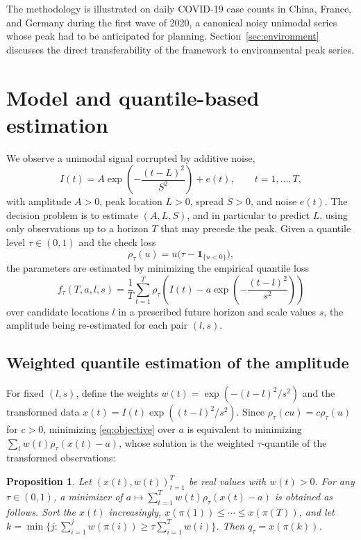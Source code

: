 \documentclass[11pt,a4paper]{article}
\newtheorem{proposition}{Proposition}
\begin{document}
The methodology is illustrated on daily COVID-19 case counts in China, France,
and Germany during the first wave of 2020, a canonical noisy unimodal series
whose peak had to be anticipated for planning. Section~\ref{sec:environment}
discusses the direct transferability of the framework to environmental peak
series.

\section{Model and quantile-based estimation}
\label{sec:model}

We observe a unimodal signal corrupted by additive noise,
\begin{equation}
I(t)=A\exp\!\left(-\frac{(t-L)^2}{S^2}\right)+e(t),
\qquad t=1,\ldots,T,
\label{eq:signal}
\end{equation}
with amplitude $A>0$, peak location $L>0$, spread $S>0$, and noise $e(t)$.
The decision problem is to estimate $(A,L,S)$, and in particular to predict
$L$, using only observations up to a horizon $T$ that may precede the peak.
Given a quantile level $\tau\in(0,1)$ and the check loss
\begin{equation}
\rho_\tau(u)=u\bigl(\tau-\mathbf 1_{\{u<0\}}\bigr),
\label{eq:check}
\end{equation}
the parameters are estimated by minimizing the empirical quantile loss
\begin{equation}
f_\tau(T,a,l,s)=\frac{1}{T}\sum_{t=1}^{T}
\rho_\tau\!\left(I(t)-a\exp\!\left(-\frac{(t-l)^2}{s^2}\right)\right)
\label{eq:objective}
\end{equation}
over candidate locations $l$ in a prescribed future horizon and scale values
$s$, the amplitude being re-estimated for each pair $(l,s)$.

\subsection{Weighted quantile estimation of the amplitude}
\label{sec:weighted}

For fixed $(l,s)$, define the weights $w(t)=\exp(-(t-l)^2/s^2)$ and the
transformed data $x(t)=I(t)\exp((t-l)^2/s^2)$. Since $\rho_\tau(cu)=c\rho_\tau(u)$
for $c>0$, minimizing \eqref{eq:objective} over $a$ is equivalent to
minimizing $\sum_t w(t)\rho_\tau(x(t)-a)$, whose solution is the weighted
$\tau$-quantile of the transformed observations:

\begin{proposition}
\label{prop:weighted}
Let $(x(t),w(t))_{t=1}^T$ be real values with $w(t)>0$. For any
$\tau\in(0,1)$, a minimizer of $a\mapsto\sum_{t=1}^T w(t)\rho_\tau(x(t)-a)$
is obtained as follows. Sort the $x(t)$ increasingly,
$x(\pi(1))\le\cdots\le x(\pi(T))$, and let
$k=\min\{j:\sum_{i=1}^j w(\pi(i))\ge\tau\sum_{i=1}^T w(i)\}$. Then
$q_\tau=x(\pi(k))$.
\end{proposition}
\end{document}
